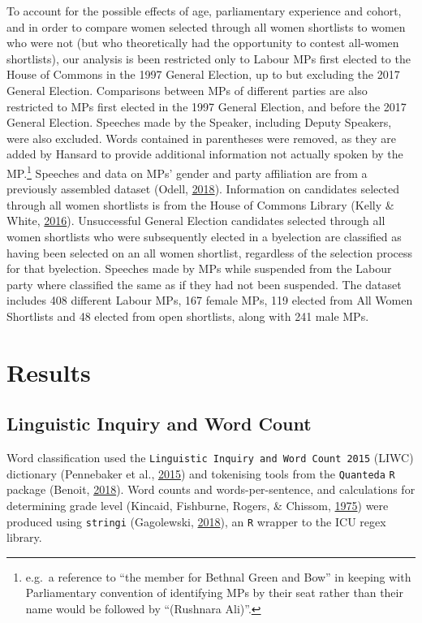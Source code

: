 \documentclass[]{article}
\let\rmarkdownfootnote\footnote%
\def\footnote{\protect\rmarkdownfootnote}
\theoremstyle{definition}
\theoremstyle{definition}
\theoremstyle{definition}
\theoremstyle{remark}
\begin{document}
\begin{table}[H]
\begin{table}[H]
To account for the possible effects of age, parliamentary experience and
cohort, and in order to compare women selected through all women
shortlists to women who were not (but who theoretically had the
opportunity to contest all-women shortlists), our analysis is been
restricted only to Labour MPs first elected to the House of Commons in
the 1997 General Election, up to but excluding the 2017 General
Election. Comparisons between MPs of different parties are also
restricted to MPs first elected in the 1997 General Election, and before
the 2017 General Election. Speeches made by the Speaker, including
Deputy Speakers, were also excluded. Words contained in parentheses were
removed, as they are added by Hansard to provide additional information
not actually spoken by the MP.\footnote{e.g.~a reference to ``the member
  for Bethnal Green and Bow'' in keeping with Parliamentary convention
  of identifying MPs by their seat rather than their name would be
  followed by ``(Rushnara Ali)''.} Speeches and data on MPs' gender and
party affiliation are from a previously assembled dataset (Odell,
\protect\hyperlink{ref-odell2018}{2018}). Information on candidates
selected through all women shortlists is from the House of Commons
Library (Kelly \& White, \protect\hyperlink{ref-kelly2016}{2016}).
Unsuccessful General Election candidates selected through all women
shortlists who were subsequently elected in a byelection are classified
as having been selected on an all women shortlist, regardless of the
selection process for that byelection. Speeches made by MPs while
suspended from the Labour party where classified the same as if they had
not been suspended. The dataset includes 408 different Labour MPs, 167
female MPs, 119 elected from All Women Shortlists and 48 elected from
open shortlists, along with 241 male MPs.

\hypertarget{results}{%
\section{Results}\label{results}}

\hypertarget{linguistic-inquiry-and-word-count}{%
\subsection{Linguistic Inquiry and Word
Count}\label{linguistic-inquiry-and-word-count}}

Word classification used the
\texttt{Linguistic\ Inquiry\ and\ Word\ Count\ 2015} (LIWC) dictionary
(Pennebaker et al., \protect\hyperlink{ref-pennebaker2015}{2015}) and
tokenising tools from the \texttt{Quanteda} \texttt{R} package (Benoit,
\protect\hyperlink{ref-benoit2018}{2018}). Word counts and
words-per-sentence, and calculations for determining grade level
(Kincaid, Fishburne, Rogers, \& Chissom,
\protect\hyperlink{ref-kincaid1975}{1975}) were produced using
\texttt{stringi} (Gagolewski,
\protect\hyperlink{ref-gagolewski2018}{2018}), an \texttt{R} wrapper to
the ICU regex library.


\end{table}
\end{table}
\end{document}
